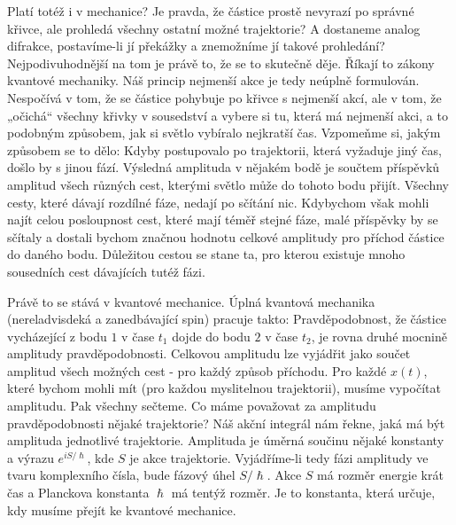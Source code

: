     Platí totéž i v mechanice? Je pravda, že částice prostě nevyrazí po správné křivce, ale prohledá
    všechny ostatní možné trajektorie? A dostaneme analog difrakce, postavíme-li jí překážky a
    znemožníme jí takové prohledání? Nejpodivuhodnější na tom je právě to, že se to skutečně děje.
    Říkají to zákony kvantové mechaniky. Náš princip nejmenší akce je tedy neúplně formulován.
    Nespočívá v tom, že se částice pohybuje po křivce s nejmenší akcí, ale v tom, že „očichá“
    všechny křivky v sousedství a vybere si tu, která má nejmenší akci, a to podobným způsobem, jak
    si světlo vybíralo nejkratší čas. Vzpomeňme si, jakým způsobem se to dělo: Kdyby postupovalo po
    trajektorii, která vyžaduje jiný čas, došlo by s jinou fází. Výsledná amplituda v nějakém bodě
    je součtem příspěvků amplitud všech různých cest, kterými světlo může do tohoto bodu přijít.
    Všechny cesty, které dávají rozdílné fáze, nedají po sčítání nic. Kdybychom však mohli najít
    celou posloupnost cest, které mají téměř stejné fáze, malé příspěvky by se sčítaly a dostali
    bychom značnou hodnotu celkové amplitudy pro příchod částice do daného bodu. Důležitou cestou se
    stane ta, pro kterou existuje mnoho sousedních cest dávajících tutéž fázi. 
    
    Právě to se stává v kvantové mechanice. Úplná kvantová mechanika (nereladvisdeká a zanedbávající
    spin) pracuje takto: Pravděpodobnost, že částice vycházející z bodu \(1\) v čase \(t_1\) dojde
    do bodu \(2\) v čase \(t_2\), je rovna druhé mocnině amplitudy pravděpodobnosti. Celkovou
    amplitudu lze vyjádřit jako součet amplitud všech možných cest - pro každý způsob příchodu. Pro
    každé \(x(t)\), které bychom mohli mít (pro každou myslitelnou trajektorii), musíme vypočítat
    amplitudu. Pak všechny sečteme. Co máme považovat za amplitudu pravděpodobnosti nějaké
    trajektorie? Náš akční integrál nám řekne, jaká má být amplituda jednotlivé trajektorie.
    Amplituda je úměrná součinu nějaké konstanty a výrazu \(e^{iS/\hslash}\), kde \(S\) je akce
    trajektorie. Vyjádříme-li tedy fázi amplitudy ve tvaru komplexního čísla, bude fázový úhel
    \(S/\hslash\). Akce \(S\) má rozměr energie krát čas a Planckova konstanta \(\hslash\) má tentýž
    rozměr. Je to konstanta, která určuje, kdy musíme přejít ke kvantové mechanice. 
    
